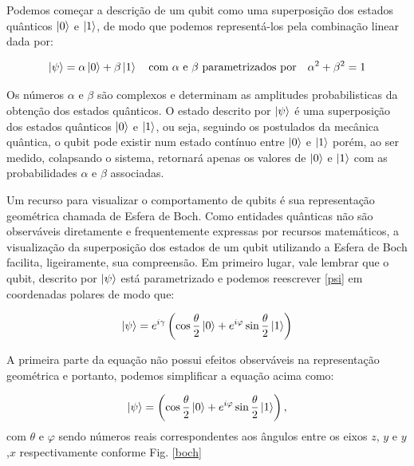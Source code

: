 \documentclass[11pt,oneside,brazil,hidelinks,article,sumario=tradicional,a4paper]{abntex2}
\begin{document}
Podemos começar a descrição de um qubit como uma superposição dos estados quânticos $\ket{0}$ e $\ket{1}$, de modo que podemos representá-los pela combinação linear dada por:

\begin{equation}\label{psi}
\ket{\psi} = \alpha \ket{0} + \beta \ket{1} \quad \text{com $\alpha$ e $\beta$ parametrizados por} \quad \alpha^{2} + \beta^{2} = 1
\end{equation}

Os números $\alpha$ e $\beta$ são complexos e determinam as amplitudes probabilisticas da obtenção dos estados quânticos.
O estado descrito por $\ket{\psi}$ é uma superposição dos estados quânticos $\ket{0}$ e $\ket{1}$, ou seja, seguindo os postulados da mecânica quântica, o qubit pode existir num estado contínuo entre $\ket{0}$ e $\ket{1}$ porém, ao ser medido, colapsando o sistema, retornará apenas os valores de $\ket{0}$ e $\ket{1}$ com as probabilidades $\alpha$ e $\beta$ associadas.

Um recurso para visualizar o comportamento de qubits é sua representação geométrica chamada de Esfera de Boch. Como entidades quânticas não são observáveis diretamente e frequentemente expressas por recursos matemáticos, a visualização da superposição dos estados de um qubit utilizando a Esfera de Boch facilita, ligeiramente, sua compreensão.
Em primeiro lugar, vale lembrar que o qubit, descrito por $\ket{\psi}$ está parametrizado e podemos reescrever \ref{psi} em coordenadas polares de modo que:

\begin{equation}
\ket{\psi}=e^{i \gamma}\left(\cos \frac{\theta}{2}\ket{0}+e^{i \varphi} \sin \frac{\theta}{2}\ket{1}\right)
\end{equation}

A primeira parte da equação não possui efeitos observáveis na representação geométrica e portanto, podemos simplificar a equação acima como:

\begin{equation}
\ket{\psi}=\left(\cos \frac{\theta}{2}\ket{0}+e^{i \varphi} \sin \frac{\theta}{2}\ket{1}\right),
\end{equation}
com $\theta$ e $\varphi$ sendo números reais correspondentes aos ângulos entre os eixos $z$, $y$ e $y$,$x$ respectivamente conforme Fig. \ref{boch}
\end{document}
